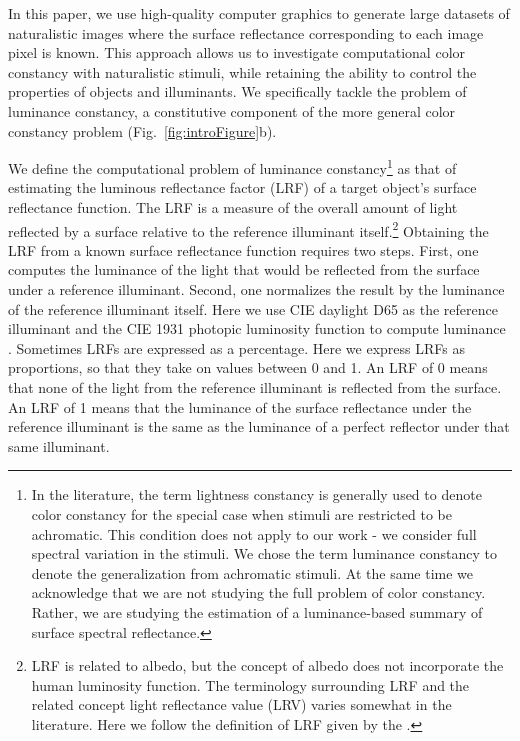 \documentclass{jov}
\begin{document}
In this paper, we use high-quality computer graphics to generate large datasets of naturalistic images where the surface reflectance corresponding to each image pixel is known. 
This approach allows us to investigate computational color constancy with naturalistic stimuli, while retaining the ability to control the properties of objects and illuminants. We specifically tackle the problem of luminance constancy, a constitutive component of the more general color constancy problem (Fig.~\ref{fig:introFigure}b). 

We define the computational problem of luminance constancy\footnote{In the literature, the term lightness constancy is generally used to denote color constancy for the special case when stimuli are restricted to be achromatic. This condition does not apply to our work - we consider full spectral variation in the stimuli. We chose the term luminance constancy to denote the generalization from achromatic stimuli. At the same time we acknowledge that we are not studying the full problem of color constancy. Rather, we are studying the estimation of a luminance-based summary of surface spectral reflectance.} as that of estimating the luminous reflectance factor (LRF) of a target object's surface reflectance function.
The LRF is a measure of the overall amount of light reflected by a surface relative to the reference illuminant itself.\footnote{LRF is related to albedo, but the concept of albedo does not incorporate the human luminosity function. The terminology surrounding LRF and the related concept light reflectance value (LRV) varies somewhat in the literature. Here we follow the definition of LRF given by the .}
Obtaining the LRF from a known surface reflectance function requires two steps.
First, one computes the luminance of the light that would be reflected from the surface under a reference illuminant.
Second, one normalizes the result by the luminance of the reference illuminant itself.
Here we use CIE daylight D65 as the reference illuminant and the CIE 1931 photopic luminosity function to compute luminance \cite{CIE86}.
Sometimes LRFs are expressed as a percentage.
Here we express LRFs as proportions, so that they take on values between 0 and 1. 
An LRF of 0 means that none of the light from the reference illuminant is reflected from the surface. 
An LRF of 1 means that the luminance of the surface reflectance under the reference illuminant is the same as the luminance of a perfect reflector under that same illuminant.
\end{document}
